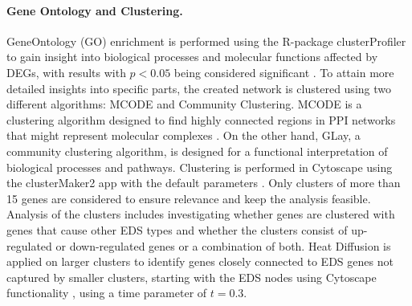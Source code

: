 \paragraph{Gene Ontology and Clustering.}
GeneOntology (GO) enrichment is performed using the R-package clusterProfiler to gain insight into biological processes and molecular functions affected by DEGs, with results with $p < 0.05$ being considered significant \cite{Ashburner2000,Consortium2023, Wu2021}. To attain more detailed insights into specific parts, the created network is clustered using two different algorithms: MCODE and Community Clustering. MCODE is a clustering algorithm designed to find highly connected regions in PPI networks that might represent molecular complexes \cite{mcode}. On the other hand, GLay, a community clustering algorithm, is designed for a functional interpretation of biological processes and pathways. Clustering is performed in Cytoscape using the clusterMaker2 app with the default parameters \cite{Cytoscape, clusterMaker2}. Only clusters of more than 15 genes are considered to ensure relevance and keep the analysis feasible. Analysis of the clusters includes investigating whether genes are clustered with genes that cause other EDS types and whether the clusters consist of up-regulated or down-regulated genes or a combination of both. Heat Diffusion is applied on larger clusters to identify genes closely connected to EDS genes not captured by smaller clusters, starting with the EDS nodes using Cytoscape functionality \cite{heatDiffusion}, using a time parameter of $t=0.3$.


